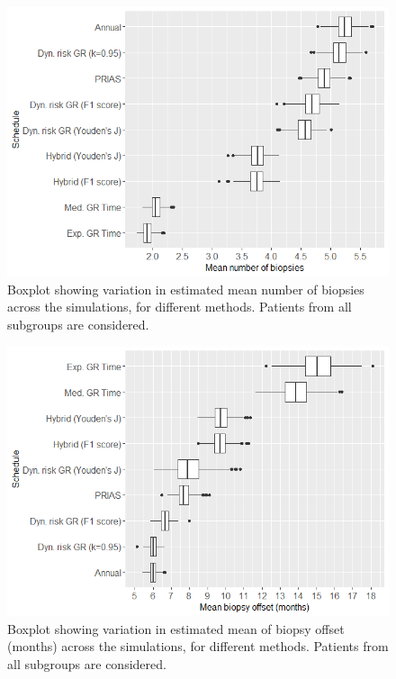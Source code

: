 \begin{figure}[!htb]
\centerline{\includegraphics[width=\columnwidth]{images/sim_study/nbMeanBoxPlot_all.png}}
\caption{Boxplot showing variation in estimated mean number of biopsies across the simulations, for different methods. Patients from all subgroups are considered.}
\label{fig : nbMeanBoxPlot_all}
\end{figure}

\begin{figure}[!htb]
\centerline{\includegraphics[width=\columnwidth]{images/sim_study/offsetMeanBoxPlot_all.png}}
\caption{Boxplot showing variation in estimated mean of biopsy offset (months) across the simulations, for different methods. Patients from all subgroups are considered.}
\label{fig : offsetMeanBoxPlot_all}
\end{figure}

